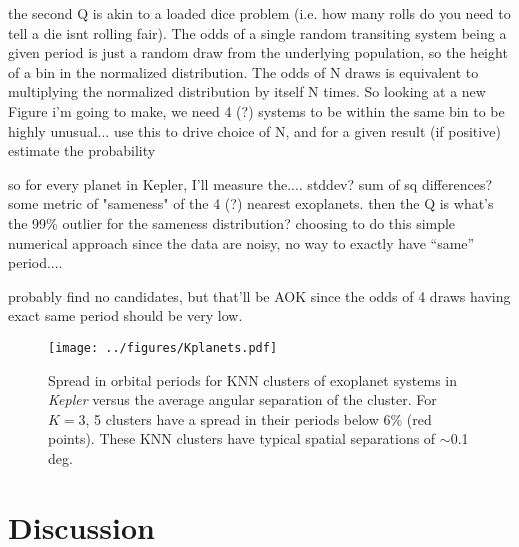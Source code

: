 \documentclass[twocolumn]{aastex62}
\newcommand{\Kepler}{\textsl{Kepler}\xspace}
\begin{document}
the second Q is akin to a loaded dice problem (i.e. how many rolls do you need to tell a die isnt rolling fair). The odds of a single random transiting system being a given period is just a random draw from the underlying population, so the height of a bin in the normalized distribution. The odds of N draws is equivalent to multiplying the normalized distribution by itself N times. So looking at a new Figure i'm going to make, we need 4 (?) systems to be within the same bin to be highly unusual... use this to drive choice of N, and for a given result (if positive) estimate the probability

so for every planet in Kepler, I'll measure the.... stddev? sum of sq differences? some metric of "sameness"
of the 4 (?) nearest exoplanets.
then the Q is what's the  99\% outlier for the sameness distribution?
choosing to do this simple numerical approach since the data are noisy, no way to exactly have ``same'' period....

probably find no candidates, but that'll be AOK since the odds of 4 draws having exact same period should be very low.



\begin{figure}[!t]
\centering
\texttt{[image: ../figures/Kplanets.pdf]}
\caption{Spread in orbital periods for KNN clusters of exoplanet systems in \Kepler versus the average angular separation of the cluster. For $K=3$, 5 clusters have a spread in their periods below 6\% (red points). These KNN clusters have typical spatial separations of $\sim$0.1 deg.}
\label{fig:knn}
\end{figure}






\section{Discussion}
\label{sec:discussion}
%
%
%
%
\end{document}
